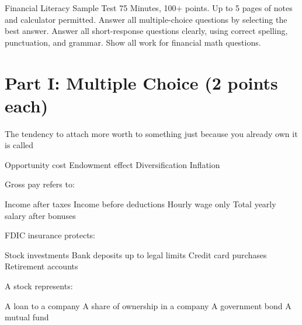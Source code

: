 \documentclass[12pt]{exam}
\begin{document}


\FontEasyRead

\Heading
{Financial Literacy}
{Sample Test}
{75 Minutes, 100+ points.
  Up to 5 pages of notes and calculator permitted.
  Answer all multiple-choice questions by selecting the best answer.
  Answer all short-response questions clearly, using correct spelling, punctuation, and grammar.
Show all work for financial math questions.}

\section*{Part I: Multiple Choice (2 points each)}

\begin{questions}

  \begin{mcquestion}[2]
    The tendency to attach more worth to something just because you already own it is called
    \begin{choices}
      \choice Opportunity cost
      \CorrectChoice Endowment effect
      \choice Diversification
      \choice Inflation
    \end{choices}
  \end{mcquestion}

  \begin{mcquestion}[2]
    Gross pay refers to:
    \begin{choices}
      \choice Income after taxes
      \CorrectChoice Income before deductions
      \choice Hourly wage only
      \choice Total yearly salary after bonuses
    \end{choices}
  \end{mcquestion}

  \begin{mcquestion}[2]
    FDIC insurance protects:
    \begin{choices}
      \choice Stock investments
      \CorrectChoice Bank deposits up to legal limits
      \choice Credit card purchases
      \choice Retirement accounts
    \end{choices}
  \end{mcquestion}

  \begin{mcquestion}[2]
    A stock represents:
    \begin{choices}
      \choice A loan to a company
      \CorrectChoice A share of ownership in a company
      \choice A government bond
      \choice A mutual fund
    \end{choices}
  \end{mcquestion}


\end{questions}
\end{document}
